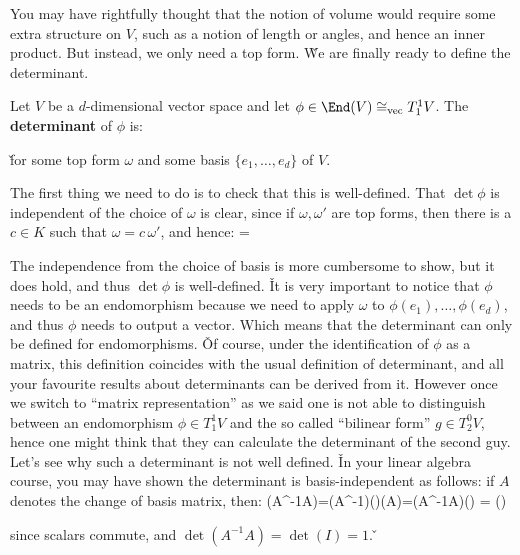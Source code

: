 You may have rightfully thought that the notion of volume would require some extra structure on $V$, such as a notion
of length or angles, and hence an inner product. But instead, we only need a top form. \v

We are finally ready to define the determinant.

\bd [Determinant]
Let $V$ be a $d$-dimensional vector space and let $\phi \in \End (V) \cong_\mathrm{vec}T^1_1 V$. The
\textbf{determinant} of $\phi$ is:
\bse
\det \phi \coloneqq {}
\ese

\v

for some top form $\omega$ and some basis $\{e_1,\ldots,e_d\}$ of $V$.
\ed

The first thing we need to do is to check that this is well-defined. That $\det \phi$ is independent of the choice of
$\omega$ is clear, since if $\omega,\omega'$ are top forms, then there is a $c \in K$ such that $\omega = c\,
\omega'$, and hence:
\bse
{} =
\ese

The independence from the choice of basis is more cumbersome to show, but it does hold, and thus $\det \phi$ is
well-defined. \v

It is very important to notice that $\phi$ needs to be an endomorphism because we need to apply $\omega$ to $\phi
(e_1),\ldots,\phi(e_d)$, and thus $\phi$ needs to output a vector. Which means that the determinant can only be
defined for endomorphisms. \v

Of course, under the identification of $\phi$ as a matrix, this definition coincides with the usual definition of
determinant, and all your favourite results about determinants can be derived from it. However once we switch to
``matrix representation'' as we said one is not able to distinguish between an endomorphism $\phi \in T^1_1 V$ and
the so called ``bilinear form'' $g\in T^0_2 V$, hence one might think that they can calculate the determinant of the
second guy. Let's see why such a determinant is not well defined. \v

In your linear algebra course, you may have shown the determinant is basis-independent as follows: if $A$ denotes the
change of basis matrix, then:
\bse
\det(A^{-1}\phi A)=\det(A^{-1})\det(\phi)\det(A)=\det(A^{-1}A)\det(\phi) = \det(\phi)
\ese

since scalars commute, and $\det(A^{-1}A)=\det(I)=1$. \v

